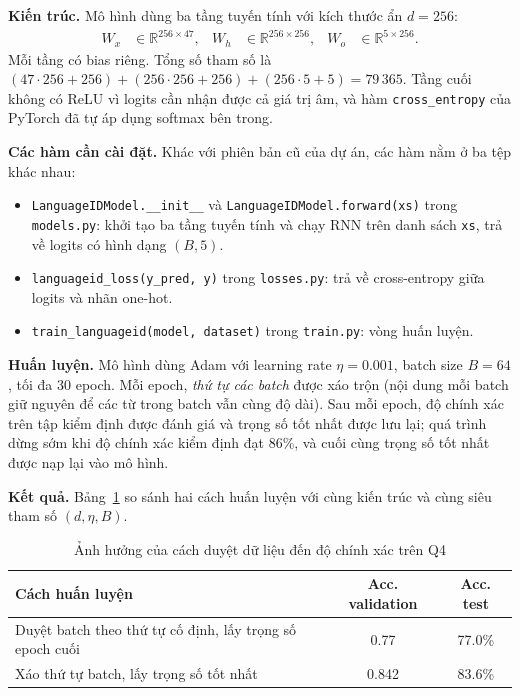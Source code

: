 \textbf{Kiến trúc.} Mô hình dùng ba tầng tuyến tính với kích thước ẩn $d = 256$:
\begin{align}
W_x &\in \mathbb{R}^{256 \times 47}, & W_h &\in \mathbb{R}^{256 \times 256}, &
W_o &\in \mathbb{R}^{5 \times 256}.
\end{align}
Mỗi tầng có bias riêng. Tổng số tham số là
$(47 \cdot 256 + 256) + (256 \cdot 256 + 256) + (256 \cdot 5 + 5) = 79\,365$.
Tầng cuối không có ReLU vì logits cần nhận được cả giá trị âm, và hàm
\texttt{cross\_entropy} của PyTorch đã tự áp dụng softmax bên trong.

\textbf{Các hàm cần cài đặt.} Khác với phiên bản cũ của dự án, các hàm nằm ở ba
tệp khác nhau:
\begin{itemize}
  \item \texttt{LanguageIDModel.\_\_init\_\_} và \texttt{LanguageIDModel.forward(xs)}
  trong \texttt{models.py}: khởi tạo ba tầng tuyến tính và chạy RNN trên danh sách
  \texttt{xs}, trả về logits có hình dạng $(B, 5)$.
  \item \texttt{languageid\_loss(y\_pred, y)} trong \texttt{losses.py}: trả về
  cross-entropy giữa logits và nhãn one-hot.
  \item \texttt{train\_languageid(model, dataset)} trong \texttt{train.py}: vòng
  huấn luyện.
\end{itemize}

\textbf{Huấn luyện.} Mô hình dùng Adam với learning rate $\eta = 0.001$, batch size
$B = 64$, tối đa 30 epoch. Mỗi epoch, \emph{thứ tự các batch} được xáo trộn
(nội dung mỗi batch giữ nguyên để các từ trong batch vẫn cùng độ dài). Sau mỗi
epoch, độ chính xác trên tập kiểm định được đánh giá và trọng số tốt nhất được
lưu lại; quá trình dừng sớm khi độ chính xác kiểm định đạt 86\%, và cuối cùng
trọng số tốt nhất được nạp lại vào mô hình.

\textbf{Kết quả.} Bảng~\ref{tab:q4_train} so sánh hai cách huấn luyện với cùng
kiến trúc và cùng siêu tham số $(d, \eta, B)$.
\begin{table}[htbp]
\caption{Ảnh hưởng của cách duyệt dữ liệu đến độ chính xác trên Q4}
\label{tab:q4_train}
\centering
\begin{tabular}{p{7.2cm}cc}
\toprule
Cách huấn luyện & Acc. validation & Acc. test \\
\midrule
Duyệt batch theo thứ tự cố định, lấy trọng số epoch cuối & 0.77 & 77.0\% \\
Xáo thứ tự batch, lấy trọng số tốt nhất & 0.842 & 83.6\% \\
\bottomrule
\end{tabular}
\end{table}

